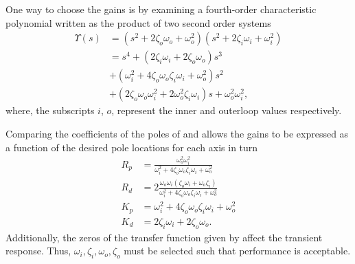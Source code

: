 One way to choose the gains is by examining a fourth-order
characteristic polynomial written as the product of two second order
systems
\begin{align}
\label{eq:coeffs2}
\Upsilon(s) &= (s^2 + 2\zeta_o\omega_o + \omega_o^2)(s^2 + 2\zeta_i\omega_i + \omega_i^2) \nonumber \\
&=s^4+(2\zeta_i\omega_i+2\zeta_o\omega_o)s^3 \nonumber \\
&+(\omega_i^2+4\zeta_o\omega_o\zeta_i\omega_i+\omega_o^2)s^2 \nonumber \\
&+(2\zeta_o\omega_o\omega_i^2+2\omega_o^2\zeta_i\omega_i)s
+\omega_o^2\omega_i^2,
\end{align}
where, the subscripts $i$, $o$, represent the inner and outerloop
values respectively.

Comparing the coefficients of the poles of  and
 allows the gains to be expressed as a function of
the desired pole locations for each axis in turn
\begin{align}
\label{eq:gains2}
R_p &= \frac{\omega_o^2\omega_i^2}{\omega_i^2+4\zeta_o\omega_o\zeta_i\omega_i+\omega_o^2} \nonumber \\
R_d &=
2\frac{\omega_o\omega_i(\zeta_o\omega_i+\omega_o\zeta_i)}{\omega_i^2+4\zeta_o\omega_o\zeta_i\omega_i+\omega_o^2}
\nonumber \\
K_p &= \omega_i^2+4\zeta_o\omega_o\zeta_i\omega_i+\omega_o^2 \nonumber \\
K_d &= 2\zeta_i\omega_i+2\zeta_o\omega_o.
\end{align}
Additionally, the zeros of the transfer function given by
 affect the transient response. Thus, $\omega_i,
\zeta_i,\omega_o, \zeta_o$ must be selected such that performance is
acceptable.
%

